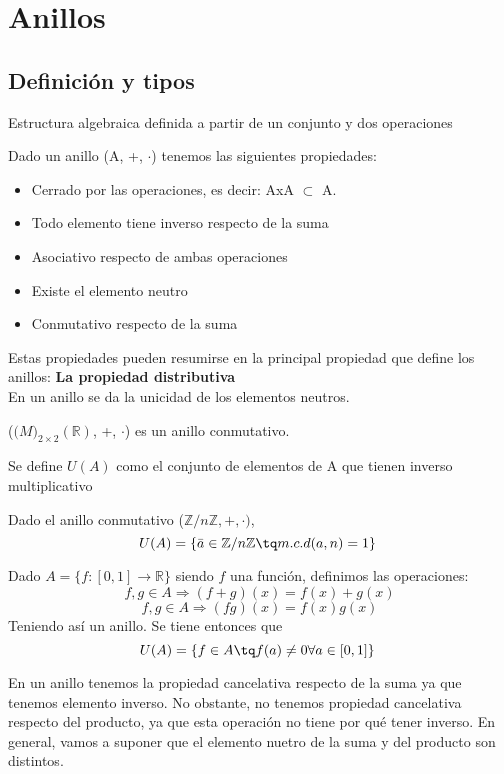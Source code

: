 \documentclass[nochap]{apuntes}
\begin{document}
\section{Anillos}
\subsection{Definición y tipos}
\begin{defn}[Anillo]
 Estructura algebraica definida a partir de un conjunto y dos operaciones
\end{defn}
Dado un anillo (A, +, $\cdot$) tenemos las siguientes propiedades:
\begin{itemize}
 \item Cerrado por las operaciones, es decir: AxA $\subset$ A. 
 \item Todo elemento tiene inverso respecto de la suma
 \item Asociativo respecto de ambas operaciones
 \item Existe el elemento neutro
 \item Conmutativo respecto de la suma
\end{itemize}
Estas propiedades pueden resumirse en la principal propiedad que define los anillos: \textbf{La propiedad distributiva}\\
En un anillo se da la unicidad de los elementos neutros.
\begin{example}
 ($\mathbb(M)_{2\times 2}(\mathbb{R})$, +, $\cdot$) es un anillo conmutativo.
\end{example}

\begin{defn}[Unidades]
 Se define $U(A)$ como  el conjunto de elementos de A que tienen inverso multiplicativo
\end{defn}

\begin{example}
 Dado el anillo conmutativo ($\mathbb{Z}/n\mathbb{Z},+,\cdot)$, \[ U(A)=\{\bar{a}\in\mathbb{Z}/n\mathbb{Z} \tq m.c.d(a,n)=1\} \]
\end{example}

\begin{example}
 Dado $A=\{f:[0,1] \rightarrow \mathbb{R}\}$  siendo $f$ una función, definimos las operaciones: 
 \[f, g \in A \Rightarrow (f+g)(x)=f(x)+g(x)\]
 \[f, g \in A \Rightarrow (fg)(x)=f(x)g(x)\]
 Teniendo así un anillo. Se tiene entonces que \[ U(A)=\{f\in A \tq f(a) \neq 0 \forall a \in [0,1]\} \]
\end{example}

En un anillo tenemos la propiedad cancelativa respecto de la suma ya que tenemos elemento inverso. No obstante, no tenemos propiedad cancelativa respecto del producto, ya que esta operación no tiene por qué tener inverso. En general, vamos a suponer que el elemento nuetro de la suma y del producto son distintos.
\end{document}
